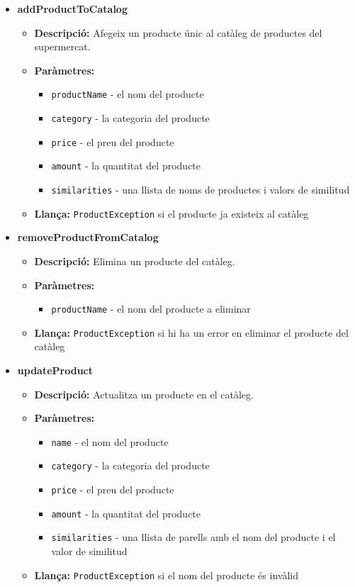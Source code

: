 \documentclass[a4paper, t]{article}
\begin{document}
\begin{itemize}
    \item \textbf{addProductToCatalog}
    \begin{itemize}
        \item \textbf{Descripció:} Afegeix un producte únic al catàleg de productes del supermercat.
        \item \textbf{Paràmetres:}
        \begin{itemize}
            \item \texttt{productName} - el nom del producte
            \item \texttt{category} - la categoria del producte
            \item \texttt{price} - el preu del producte
            \item \texttt{amount} - la quantitat del producte
            \item \texttt{similarities} - una llista de noms de productes i valors de similitud
        \end{itemize}
        \item \textbf{Llança:} \texttt{ProductException} si el producte ja existeix al catàleg
    \end{itemize}

    \item \textbf{removeProductFromCatalog}
    \begin{itemize}
        \item \textbf{Descripció:} Elimina un producte del catàleg.
        \item \textbf{Paràmetres:}
        \begin{itemize}
            \item \texttt{productName} - el nom del producte a eliminar
        \end{itemize}
        \item \textbf{Llança:} \texttt{ProductException} si hi ha un error en eliminar el producte del catàleg
    \end{itemize}

    \item \textbf{updateProduct}
    \begin{itemize}
        \item \textbf{Descripció:} Actualitza un producte en el catàleg.
        \item \textbf{Paràmetres:}
        \begin{itemize}
            \item \texttt{name} - el nom del producte
            \item \texttt{category} - la categoria del producte
            \item \texttt{price} - el preu del producte
            \item \texttt{amount} - la quantitat del producte
            \item \texttt{similarities} - una llista de parells amb el nom del producte i el valor de similitud
        \end{itemize}
        \item \textbf{Llança:} \texttt{ProductException} si el nom del producte és invàlid
    \end{itemize}


\end{itemize}
\end{document}
